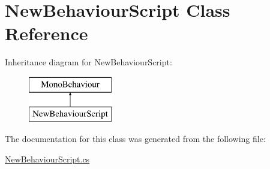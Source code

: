 \hypertarget{class_new_behaviour_script}{}\section{New\+Behaviour\+Script Class Reference}
\label{class_new_behaviour_script}
Inheritance diagram for New\+Behaviour\+Script\+:\begin{figure}[H]
\begin{center}
\leavevmode
\includegraphics[height=2.000000cm]{class_new_behaviour_script}
\end{center}
\end{figure}


The documentation for this class was generated from the following file\+:\begin{DoxyCompactItemize}
\item 
\hyperlink{_new_behaviour_script_8cs}{New\+Behaviour\+Script.\+cs}\end{DoxyCompactItemize}

